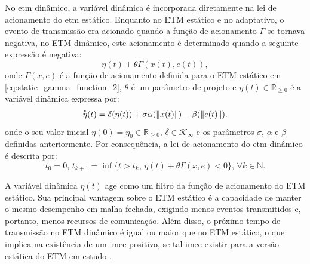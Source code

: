 No \acrshort{etm} dinâmico, a variável dinâmica é incorporada diretamente na lei de acionamento do \acrshort{etm} estático. Enquanto no ETM estático e no adaptativo, o evento de transmissão era acionado quando a função de acionamento $\Gamma$ se tornava negativa, no ETM dinâmico, este acionamento é determinado quando a seguinte expressão é negativa: \begin{equation}
  \eta(t) + \theta\Gamma(x(t), e(t)),
\end{equation} onde $\Gamma(x, e)$ é a função de acionamento definida para o ETM estático em \eqref{eq:static_gamma_function_2}, $\theta$ é um parâmetro de projeto e $\eta(t) \in \mathbb{R}_{\geq 0}$ é a variável dinâmica expressa por: \begin{equation}
  \dt{\eta}(t) = \delta(\eta(t)) + \sigma \alpha(\|x(t)\|) - \beta(\|e(t)\|).
  \label{eq:dynamic_etm_dot_eta}
\end{equation} onde o seu valor inicial $\eta(0) = \eta_0 \in \mathbb{R}_{\geq 0}$, $\delta \in \mathcal{K}_\infty$ e os parâmetros $\sigma$, $\alpha$ e $\beta$ definidas anteriormente. Por consequência, a lei de acionamento do \acrshort{etm} dinâmico é descrita por: \begin{equation}
  t_0 = 0, \, t_{k+1} = \inf\{t > t_k, \, \eta(t) + \theta \Gamma(x, e) < 0\}, \, \forall k \in \mathbb{N}. \label{eq:dynamic_event_triggering_law}
\end{equation}

A variável dinâmica $\eta(t)$ age como um filtro da função de acionamento do ETM estático. Sua principal vantagem sobre o ETM estático é a capacidade de manter o mesmo desempenho em malha fechada, exigindo menos eventos transmitidos e, portanto, menos recursos de comunicação. Além disso, o próximo tempo de transmissão no ETM dinâmico é igual ou maior que no ETM estático, o que implica na existência de um \acrshort{imee} positivo, se tal \acrshort{imee} existir para a versão estática do ETM em estudo \citep{coutinho2021}.

